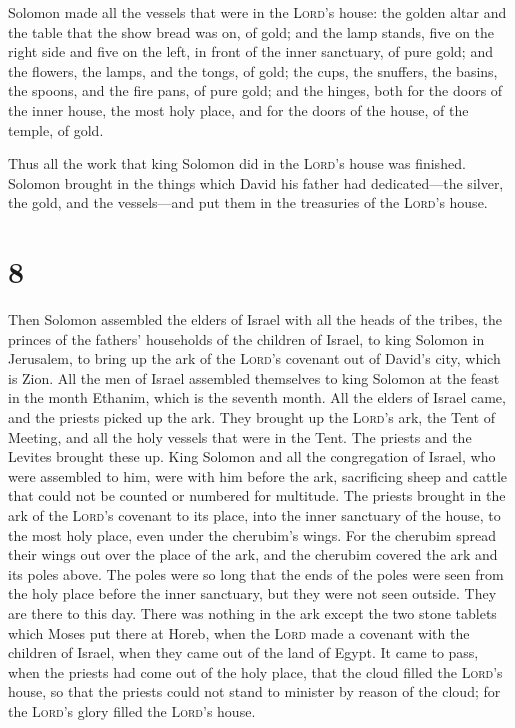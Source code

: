  Solomon made all the vessels that were in the
\textsc{Lord}'s house: the golden altar and the table that the show
bread was on, of gold;  and the lamp stands, five on the
right side and five on the left, in front of the inner sanctuary, of
pure gold; and the flowers, the lamps, and the tongs, of gold;
 the cups, the snuffers, the basins, the spoons, and the
fire pans, of pure gold; and the hinges, both for the doors of the inner
house, the most holy place, and for the doors of the house, of the
temple, of gold.

 Thus all the work that king Solomon did in the
\textsc{Lord}'s house was finished. Solomon brought in the things which
David his father had dedicated---the silver, the gold, and the
vessels---and put them in the treasuries of the \textsc{Lord}'s house.

\hypertarget{section-7}{%
\section{8}\label{section-7}}

 Then Solomon assembled the elders of Israel with all the
heads of the tribes, the princes of the fathers' households of the
children of Israel, to king Solomon in Jerusalem, to bring up the ark of
the \textsc{Lord}'s covenant out of David's city, which is Zion.
 All the men of Israel assembled themselves to king
Solomon at the feast in the month Ethanim, which is the seventh month.
 All the elders of Israel came, and the priests picked up
the ark.  They brought up the \textsc{Lord}'s ark, the
Tent of Meeting, and all the holy vessels that were in the Tent. The
priests and the Levites brought these up.  King Solomon
and all the congregation of Israel, who were assembled to him, were with
him before the ark, sacrificing sheep and cattle that could not be
counted or numbered for multitude.  The priests brought in
the ark of the \textsc{Lord}'s covenant to its place, into the inner
sanctuary of the house, to the most holy place, even under the
cherubim's wings.  For the cherubim spread their wings out
over the place of the ark, and the cherubim covered the ark and its
poles above.  The poles were so long that the ends of the
poles were seen from the holy place before the inner sanctuary, but they
were not seen outside. They are there to this day.  There
was nothing in the ark except the two stone tablets which Moses put
there at Horeb, when the \textsc{Lord} made a covenant with the children
of Israel, when they came out of the land of Egypt.  It
came to pass, when the priests had come out of the holy place, that the
cloud filled the \textsc{Lord}'s house,  so that the
priests could not stand to minister by reason of the cloud; for the
\textsc{Lord}'s glory filled the \textsc{Lord}'s house.

